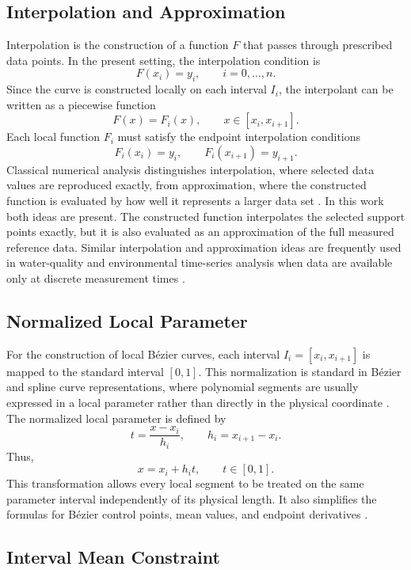 \documentclass[12pt,a4paper]{article}
\begin{document}
\subsection{Interpolation and Approximation}

Interpolation is the construction of a function \(F\) that passes through prescribed data points. In the present setting, the interpolation condition is
\[
F(x_i)=y_i,
\qquad i=0,\dots,n.
\]
Since the curve is constructed locally on each interval \(I_i\), the interpolant can be written as a piecewise function
\[
F(x)=F_i(x),
\qquad x\in[x_i,x_{i+1}].
\]
Each local function \(F_i\) must satisfy the endpoint interpolation conditions
\[
F_i(x_i)=y_i,
\qquad
F_i(x_{i+1})=y_{i+1}.
\]
Classical numerical analysis distinguishes interpolation, where selected data values are reproduced exactly, from approximation, where the constructed function is evaluated by how well it represents a larger data set \cite{krylyk2013computational,deboor1978splines}. In this work both ideas are present. The constructed function interpolates the selected support points exactly, but it is also evaluated as an approximation of the full measured reference data. Similar interpolation and approximation ideas are frequently used in water-quality and environmental time-series analysis when data are available only at discrete measurement times \cite{gnauck2004waterquality,lepot2017interpolation}.

\subsection{Normalized Local Parameter}

For the construction of local B\'ezier curves, each interval \(I_i=[x_i,x_{i+1}]\) is mapped to the standard interval \([0,1]\). This normalization is standard in B\'ezier and spline curve representations, where polynomial segments are usually expressed in a local parameter rather than directly in the physical coordinate \cite{farin2002curves,piegl1997nurbs}. The normalized local parameter is defined by
\[
t=\frac{x-x_i}{h_i},
\qquad h_i=x_{i+1}-x_i.
\]
Thus,
\[
x=x_i+h_i t,
\qquad t\in[0,1].
\]
This transformation allows every local segment to be treated on the same parameter interval independently of its physical length. It also simplifies the formulas for B\'ezier control points, mean values, and endpoint derivatives \cite{farin2002curves,mitBezierProperties}.

\subsection{Interval Mean Constraint}
\end{document}
